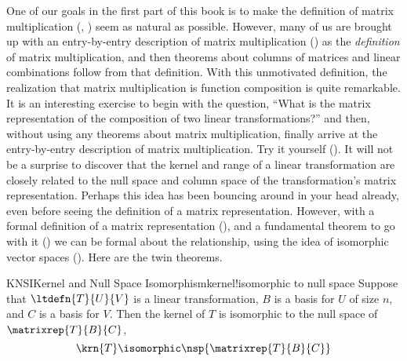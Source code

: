 One of our goals in the first part of this book is to make the definition of matrix multiplication (, ) seem as natural as possible.  However, many of us are brought up with an entry-by-entry description of matrix multiplication () as the {\em definition} of matrix multiplication, and then theorems about columns of matrices and linear combinations follow from that definition.  With this unmotivated definition, the realization that matrix multiplication is function composition is quite remarkable.  It is an interesting exercise to begin with the question, ``What is the matrix representation of the composition of two linear transformations?'' and then, without using any theorems about matrix multiplication, finally arrive at the entry-by-entry description of matrix multiplication.  Try it yourself ().
%
%
It will not be a surprise to discover that the kernel and range of a linear transformation are closely related to the null space and column space of the transformation's matrix representation.  Perhaps this idea has been bouncing around in your head already, even before seeing the definition of a matrix representation.  However, with a formal definition of a matrix representation (), and a fundamental theorem to go with it () we can be formal about the relationship, using the idea of isomorphic vector spaces ().  Here are the twin theorems.
%
\begin{theorem}{KNSI}{Kernel and Null Space Isomorphism}{kernel!isomorphic to null space}
Suppose that $\ltdefn{T}{U}{V}$ is a linear transformation, $B$ is a basis for $U$ of size $n$, and $C$ is a basis for $V$.  Then the kernel of $T$ is isomorphic to the null space of $\matrixrep{T}{B}{C}$,
%
\begin{equation*}
\krn{T}\isomorphic\nsp{\matrixrep{T}{B}{C}}
\end{equation*}
%
\end{theorem}
%
